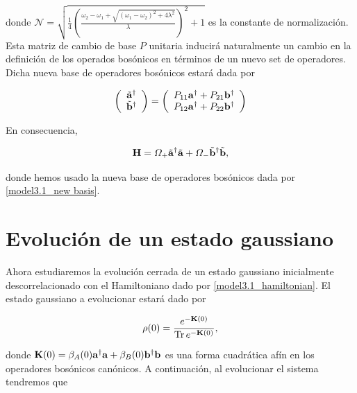\documentclass{report} %
\numberwithin{equation}{section}
\begin{document}
donde $\mathcal{N} = \sqrt{\frac{1}{4}\left(\frac{\omega_2 - \omega_1 +\sqrt{(\omega_1 - \omega_2)^2+4\lambda^2}}{\lambda}\right)^2 + 1} $ es la constante de normalización. Esta matriz de cambio de base $P$ unitaria inducirá naturalmente un cambio en la definición de los operados bosónicos en términos de un nuevo set de operadores. Dicha nueva base de operadores bosónicos estará dada por 

\begin{equation}
     \left( \begin{array}{c}
        \tilde{\bf a}^{\dagger} \\
         \tilde{\mathbf b}^{\dagger} 
    \end{array} \right) = \left(\begin{array}{c}
        P_{11} {\bf a}^{\dagger} +  P_{21}{\mathbf b}^{\dagger} \\
        P_{12} {\bf a}^{\dagger} + P_{22} {\mathbf b}^{\dagger}
    \end{array}\right)
    \label{model3.1_new basis}
\end{equation}


En consecuencia, 

\begin{equation}
    \mathbf{H} = \Omega_+ \tilde{\bf a}^{\dagger}\tilde{\bf a} + \Omega_- \tilde{\mathbf b}^{\dagger}\tilde{\mathbf b},
\end{equation}

donde hemos usado la nueva base de operadores bosónicos dada por \eqref{model3.1_new basis}.

\section{Evoluci\'on de un estado gaussiano}
\label{chap3_dingauss}

Ahora estudiaremos la evolución cerrada de un estado gaussiano inicialmente descorrelacionado con el Hamiltoniano dado por \eqref{model3.1_hamiltonian}. El estado gaussiano a evolucionar estará dado por

\begin{equation}
    \rho(0) = \frac{e^{-{\bf K}(0)}}{\Tr e^{-{\bf K}(0)}},
\end{equation}

donde ${\bf K}(0) = \beta_{A}(0){\bf a}^{\dagger} {\bf a} + \beta_{B}(0) {\mathbf b}^{\dagger}{\mathbf b}$ es una forma cuadrática afín en los operadores bosónicos canónicos. A continuación, al evolucionar el sistema tendremos que
\end{document}
